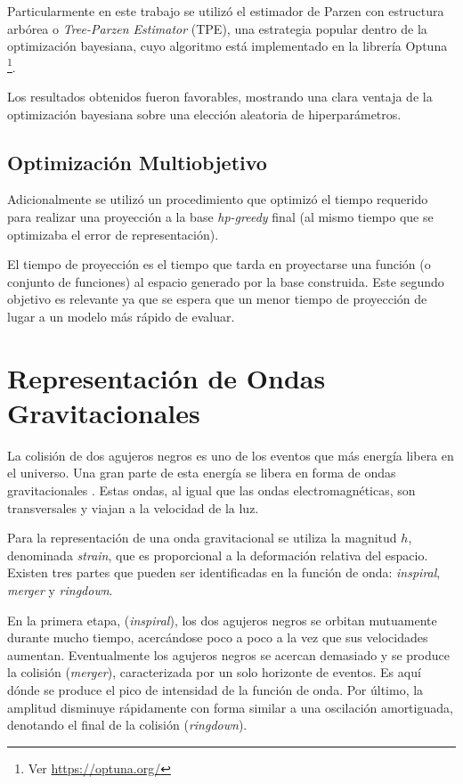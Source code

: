 Particularmente en este trabajo se utilizó el estimador de Parzen con estructura arbórea o \textit{Tree-Parzen Estimator} (TPE), una estrategia popular dentro de la optimización bayesiana, cuyo algoritmo está implementado en la librería Optuna \cite{optuna_2019} \footnote{Ver \url{https://optuna.org/}}. 


Los resultados obtenidos fueron favorables, mostrando una clara ventaja de la optimización bayesiana sobre una elección aleatoria de hiperparámetros.

\subsection*{Optimización Multiobjetivo}

Adicionalmente se utilizó un procedimiento que optimizó el tiempo requerido para realizar una proyección a la base \textit{hp-greedy} final (al mismo tiempo que se optimizaba el error de representación).

El tiempo de proyección es el tiempo que tarda en proyectarse una función (o conjunto de funciones) al espacio generado por la base construida. Este segundo objetivo es relevante ya que se espera que un menor tiempo de proyección de lugar a un modelo más rápido de evaluar.





\section{Representación de Ondas Gravitacionales}

La colisión de dos agujeros negros es uno de los eventos que más energía libera en el universo. Una gran parte de esta energía se libera en forma de ondas gravitacionales \cite{Centrella_2010}. Estas ondas, al igual que las ondas electromagnéticas, son transversales y viajan a la velocidad de la luz.

Para la representación de una onda gravitacional se utiliza la magnitud $h$, denominada \textit{strain}, que es proporcional a la deformación relativa del espacio. Existen tres partes que pueden ser identificadas en la función de onda: \textit{inspiral}, \textit{merger} y \textit{ringdown}. 

En la primera etapa, (\textit{inspiral}), los dos agujeros negros se orbitan mutuamente durante mucho tiempo, acercándose poco a poco a la vez que sus velocidades aumentan. Eventualmente los agujeros negros se acercan demasiado y se produce la colisión (\textit{merger}), caracterizada por un solo horizonte de eventos. Es aquí dónde se produce el pico de intensidad de la función de onda. Por último, la amplitud disminuye rápidamente con forma similar a una oscilación amortiguada, denotando el final de la colisión (\textit{ringdown}).

